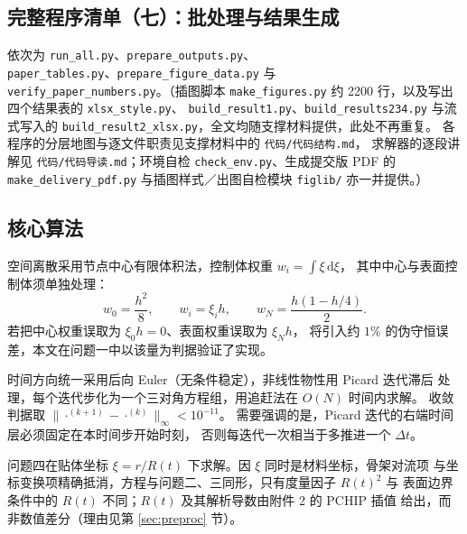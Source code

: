 \documentclass[12pt,a4paper,fontset=none]{ctexart}
\begin{document}


\subsection*{完整程序清单（七）：批处理与结果生成}

依次为 \texttt{run\_all.py}、\texttt{prepare\_outputs.py}、\\
\texttt{paper\_tables.py}、\texttt{prepare\_figure\_data.py} 与\\
\texttt{verify\_paper\_numbers.py}。（插图脚本 \texttt{make\_figures.py}
约 2200 行，以及写出四个结果表的 \texttt{xlsx\_style.py}、
\texttt{build\_result1.py}、\texttt{build\_results234.py} 与流式写入的
\texttt{build\_result2\_xlsx.py}，全文均随支撑材料提供，此处不再重复。
各程序的分层地图与逐文件职责见支撑材料中的 \texttt{代码/代码结构.md}，
求解器的逐段讲解见 \texttt{代码/代码导读.md}；环境自检
\texttt{check\_env.py}、生成提交版 PDF 的 \texttt{make\_delivery\_pdf.py}
与插图样式／出图自检模块 \texttt{figlib/} 亦一并提供。）











\subsection*{核心算法}

空间离散采用节点中心有限体积法，控制体权重 $w_i=\int\xi\,\mathrm{d}\xi$，
其中中心与表面控制体须单独处理：
\[
  w_0=\frac{h^2}{8},\qquad w_i=\xi_i h,\qquad
  w_N=\frac{h(1-h/4)}{2}.
\]
若把中心权重误取为 $\xi_0h=0$、表面权重误取为 $\xi_Nh$，
将引入约 $1\%$ 的伪守恒误差，本文在问题一中以该量为判据验证了实现。

时间方向统一采用后向 Euler（无条件稳定），非线性物性用 Picard 迭代滞后
处理，每个迭代步化为一个三对角方程组，用追赶法在 $O(N)$ 时间内求解。
收敛判据取 $\|\cdot^{(k+1)}-\cdot^{(k)}\|_\infty<10^{-11}$。
需要强调的是，Picard 迭代的右端时间层必须固定在本时间步开始时刻，
否则每迭代一次相当于多推进一个 $\Delta t$。

问题四在贴体坐标 $\xi=r/R(t)$ 下求解。因 $\xi$ 同时是材料坐标，骨架对流项
与坐标变换项精确抵消，方程与问题二、三同形，只有度量因子 $R(t)^2$ 与
表面边界条件中的 $R(t)$ 不同；$R(t)$ 及其解析导数由附件 2 的 PCHIP 插值
给出，而非数值差分（理由见第 \ref{sec:preproc} 节）。
\end{document}

